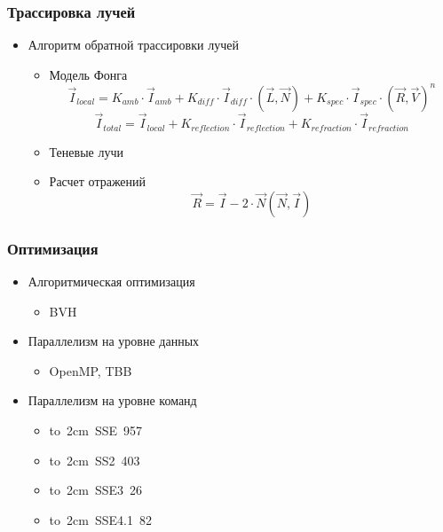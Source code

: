 \documentclass[utf8, 12pt]{beamer}
\begin{document}
\begin{frame}
\frametitle{Трассировка лучей}
\begin{itemize}
\item Алгоритм обратной трассировки лучей
\begin{itemize}
\item Модель Фонга
$$
 \vec{I}_{local} =  K_{amb} \cdot \vec{I}_{amb} +  K_{diff} \cdot \vec{I}_{diff} \cdot \left( \vec{L},\vec{N} \right) + K_{spec} \cdot \vec{I}_{spec} \cdot \left( \vec{R},\vec{V} \right)^n
$$
$$
 \vec{I}_{total} = \vec{I}_{local} + K_{reflection} \cdot \vec{I}_{reflection} + K_{refraction} \cdot \vec{I}_{refraction}
$$
\item Теневые лучи
\item Расчет отражений
$$
\vec{R} = \vec{I} - 2 \cdot \vec{N} (\vec{N} , \vec{I})
$$
\end{itemize}
\end{itemize}
\end{frame}


\begin{frame}
\frametitle{Оптимизация}
\begin{itemize}
\item Алгоритмическая оптимизация
\begin{itemize}
\item BVH 
\end{itemize}

\item Параллелизм на уровне данных
\begin{itemize}
\item OpenMP, TBB
\end{itemize}

\item Параллелизм на уровне команд
\begin{itemize}
\item \mbox{\hbox to 2cm {SSE 957}}
\item \mbox{\hbox to 2cm {SS2 403}}
\item \mbox{\hbox to 2cm {SSE3 26}}
\item \mbox{\hbox to 2cm {SSE4.1 82}}
\end{itemize}
\end{itemize}
\end{frame}
\end{document}
